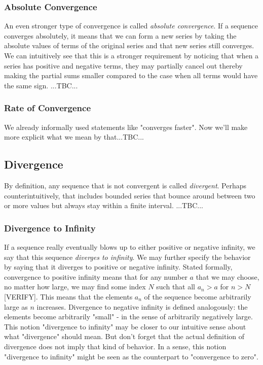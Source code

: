 \subsubsection{Absolute Convergence}
An even stronger type of convergence is called \emph{absolute convergence}. If a sequence converges absolutely, it means that we can form a new series by taking the absolute values of terms of the original series and that new series still converges. We can intuitively see that this is a stronger requirement by noticing that when a series has positive and negative terms, they may partially cancel out thereby making the partial sums smaller compared to the case when all terms would have the same sign. ...TBC...



\subsubsection{Rate of Convergence}
We already informally used statements like "converges faster". Now we'll make more explicit what we mean by that...TBC...

\subsection{Divergence}
By definition, any sequence that is not convergent is called \emph{divergent}. Perhaps counterintuitively, that includes bounded series that bounce around between two or more values but always stay within a finite interval. ...TBC...

\subsubsection{Divergence to Infinity}
If a sequence really eventually blows up to either positive or negative infinity, we say that this sequence \emph{diverges to infinity}. We may further specify the behavior by saying that it diverges to positive or negative infinity. Stated formally, convergence to positive infinity means that for any number $a$ that we may choose, no matter how large, we may find some index $N$ such that all $a_n > a$ for $n > N$ [VERIFY]. This means that the elements $a_n$ of the sequence become arbitrarily large as $n$ increases. Divergence to negative infinity is defined analogously: the elements become arbitrarily "small" - in the sense of arbitrarily negatively large. This notion "divergence to infinity" may be closer to our intuitive sense about what "divergence" should mean. But don't forget that the actual definition of divergence does not imply that kind of behavior. In a sense, this notion "divergence to infinity" might be seen as the counterpart to "convergence to zero".

